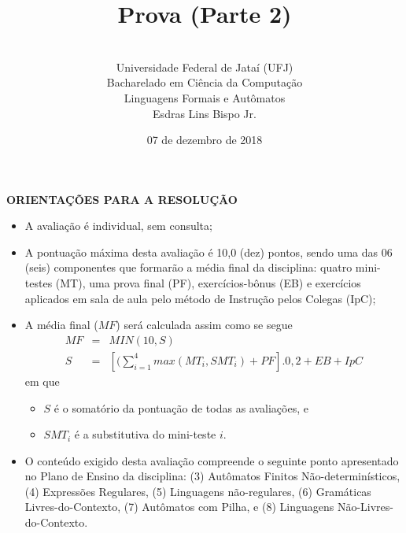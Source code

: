 \documentclass[12pt,a4paper,oneside]{article}
\author{\\Universidade Federal de Jataí (UFJ)\\Bacharelado em Ciência da Computação \\Linguagens Formais e Autômatos \\Esdras Lins Bispo Jr.}
\date{07 de dezembro de 2018}
\title{\sc \huge Prova (Parte 2)}
\begin{document}
\maketitle

{\bf ORIENTAÇÕES PARA A RESOLUÇÃO}

\small
 
\begin{itemize}
	\item A avaliação é individual, sem consulta;
	\item A pontuação máxima desta avaliação é 10,0 (dez) pontos, sendo uma das 06 (seis) componentes que formarão a média final da disciplina: quatro mini-testes (MT), uma prova final (PF), exercícios-bônus (EB) e exercícios aplicados em sala de aula pelo método de Instrução pelos Colegas (IpC);
	\item A média final ($MF$) será calculada assim como se segue
	\begin{eqnarray}
		MF & = & MIN(10, S) \nonumber \\
		S & = & [(\sum_{i=1}^{4} max(MT_i, SMT_i ) + PF].0,2  + EB + IpC\nonumber
	\end{eqnarray}
	em que 
	\begin{itemize}
		\item $S$ é o somatório da pontuação de todas as avaliações, e
		\item $SMT_i$ é a substitutiva do mini-teste $i$.
	\end{itemize}
	\item O conteúdo exigido desta avaliação compreende o seguinte ponto apresentado no Plano de Ensino da disciplina: (3) Autômatos Finitos Não-determinísticos, (4) Expressões Regulares, (5) Linguagens não-regulares, (6) Gramáticas Li\-vres-do-Contexto, (7) Autômatos com Pilha, e (8) Linguagens Não-Livres-do-Contexto.
\end{itemize}

\begin{center}
\end{center}

\newpage
\end{document}
